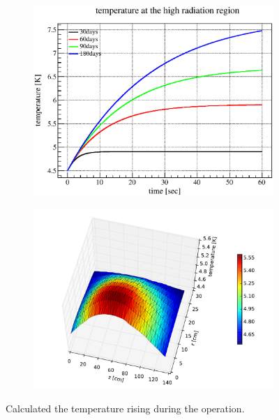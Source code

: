  \begin{figure}[H]
   \begin{subfigure}{0.3\textwidth}
    \centering
	\includegraphics[scale=0.42]{chapter5/fig/time.eps}
   \end{subfigure}
   \hspace{0.2\textwidth}
   \begin{subfigure}{0.3\textwidth}
    \centering
	\includegraphics[scale=0.42]{chapter5/fig/heatdis.pdf}
   \end{subfigure}
   \caption{Calculated the temperature rising during the operation.}
   \label{4heatdis}
  \end{figure}

